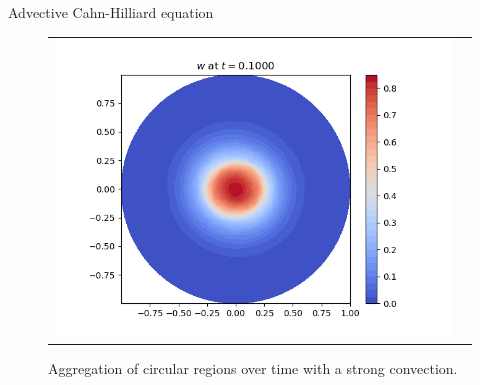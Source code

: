 \begin{frame}{Advective Cahn-Hilliard equation}
\begin{figure}
\begin{tabular}{l r}
\begin{minipage}{0.49\textwidth}
					\includegraphics[scale=0.25]{img/ch/w_DG-UPW+Eyre_nt-100_t-0.10000_P0_adv-100.0_nx-50.png}
				\end{minipage}
			\end{tabular}
				\caption{Aggregation of circular regions over time with a strong convection.}
			\end{figure}
			\end{frame}

